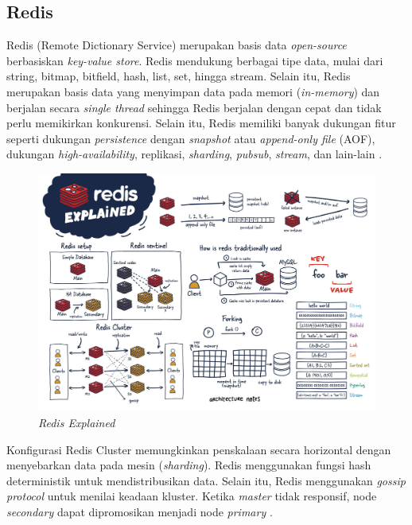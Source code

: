 \subsection{Redis}

Redis (Remote Dictionary Service) merupakan basis data \textit{open-source} berbasiskan \textit{key-value store}. Redis mendukung berbagai tipe data, mulai dari string, bitmap, bitfield, hash, list, set, hingga stream. Selain itu, Redis merupakan basis data yang menyimpan data pada memori (\textit{in-memory}) dan berjalan secara \textit{single thread} sehingga Redis berjalan dengan cepat dan tidak perlu memikirkan konkurensi. Selain itu, Redis memiliki banyak dukungan fitur seperti dukungan \textit{persistence} dengan \textit{snapshot} atau \textit{append-only file} (AOF), dukungan \textit{high-availability}, replikasi, \textit{sharding}, \textit{pubsub}, \textit{stream}, dan lain-lain \parencite{redisExplained}.

\begin{figure}[ht]
    \centering
    \includegraphics[width=1\textwidth]{resources/chapter-2/redis.jpg}
    \caption{\textit{Redis Explained \parencite{redisExplained}}}
    \label{fig:redis-explained}
\end{figure}

Konfigurasi Redis Cluster memungkinkan penskalaan secara horizontal dengan menyebarkan data pada mesin (\textit{sharding}). Redis menggunakan fungsi hash deterministik untuk mendistribusikan data. Selain itu, Redis menggunakan \textit{gossip protocol} untuk menilai keadaan kluster. Ketika \textit{master} tidak responsif, node \textit{secondary} dapat dipromosikan menjadi node \textit{primary} \parencite{redisExplained}.